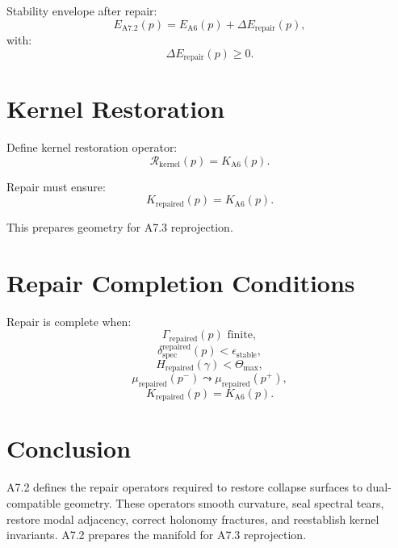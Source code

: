 \documentclass[11pt]{article}
\begin{document}
Stability envelope after repair:
\[
E_{\mathrm{A7.2}}(p)
  = E_{\mathrm{A6}}(p) + \Delta E_{\mathrm{repair}}(p),
\]
with:
\[
\Delta E_{\mathrm{repair}}(p) \ge 0.
\]

\section{Kernel Restoration}

Define kernel restoration operator:
\[
\mathcal{R}_{\mathrm{kernel}}(p)
  = K_{\mathrm{A6}}(p).
\]

Repair must ensure:
\[
K_{\mathrm{repaired}}(p) = K_{\mathrm{A6}}(p).
\]

This prepares geometry for A7.3 reprojection.

\section{Repair Completion Conditions}

Repair is complete when:
\[
\Gamma_{\mathrm{repaired}}(p) \text{ finite},
\]
\[
\delta_{\mathrm{spec}}^{\mathrm{repaired}}(p) < \epsilon_{\mathrm{stable}},
\]
\[
H_{\mathrm{repaired}}(\gamma) < \Theta_{\max},
\]
\[
\mu_{\mathrm{repaired}}(p^-) \leadsto \mu_{\mathrm{repaired}}(p^+),
\]
\[
K_{\mathrm{repaired}}(p) = K_{\mathrm{A6}}(p).
\]

\section{Conclusion}

A7.2 defines the repair operators required to restore collapse surfaces
to dual-compatible geometry. These operators smooth curvature, seal
spectral tears, restore modal adjacency, correct holonomy fractures,
and reestablish kernel invariants. A7.2 prepares the manifold for
A7.3 reprojection.
\end{document}
